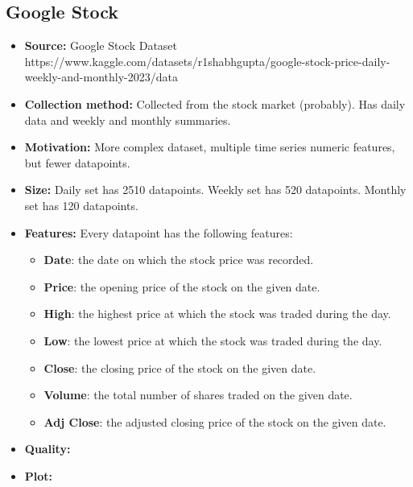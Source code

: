 \subsection{Google Stock}
\begin{itemize}
	\item \textbf{Source:} Google Stock Dataset \\ https://www.kaggle.com/datasets/r1shabhgupta/google-stock-price-daily-weekly-and-monthly-2023/data
	\item \textbf{Collection method:} Collected from the stock market (probably). Has daily data and weekly and monthly summaries.
	\item \textbf{Motivation:} More complex dataset, multiple time series numeric features, but fewer datapoints.
	\item \textbf{Size:} Daily set has 2510 datapoints. Weekly set has 520 datapoints. Monthly set has 120 datapoints.
	\item \textbf{Features:} Every datapoint has the following features:
	      \begin{itemize}
		      \item \textbf{Date}: the date on which the stock price was recorded.
		      \item \textbf{Price}: the opening price of the stock on the given date.
		      \item \textbf{High}: the highest price at which the stock was traded during the day.
		      \item \textbf{Low}: the lowest price at which the stock was traded during the day.
		      \item \textbf{Close}: the closing price of the stock on the given date.
		      \item \textbf{Volume}: the total number of shares traded on the given date.
		      \item \textbf{Adj Close}: the adjusted closing price of the stock on the given date.
	      \end{itemize}
	\item \textbf{Quality:}
	\item \textbf{Plot:}
\end{itemize}
